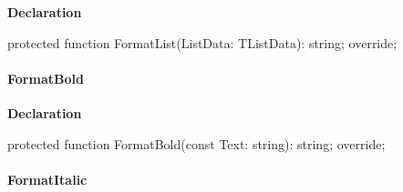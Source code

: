 \documentclass{report}
\newif\ifpdf
\begin{document}
\label{PasDoc_GenSimpleXML.TSimpleXMLDocGenerator-FormatList}
\begin{list}{}{
\setlength{\itemindent}{0cm}
\setlength{\listparindent}{0cm}
\setlength{\leftmargin}{\evensidemargin}
\addtolength{\leftmargin}{\tmplength}
\settowidth{\labelsep}{X}
\addtolength{\leftmargin}{\labelsep}
\setlength{\labelwidth}{\tmplength}
}
\item[\textbf{Declaration}\hfill]
\ifpdf
\begin{flushleft}
\fi
\begin{ttfamily}
protected function FormatList(ListData: TListData): string; override;\end{ttfamily}

\ifpdf
\end{flushleft}
\fi

\end{list}
\paragraph*{FormatBold}\hspace*{\fill}

\label{PasDoc_GenSimpleXML.TSimpleXMLDocGenerator-FormatBold}
\begin{list}{}{
\setlength{\itemindent}{0cm}
\setlength{\listparindent}{0cm}
\setlength{\leftmargin}{\evensidemargin}
\addtolength{\leftmargin}{\tmplength}
\settowidth{\labelsep}{X}
\addtolength{\leftmargin}{\labelsep}
\setlength{\labelwidth}{\tmplength}
}
\item[\textbf{Declaration}\hfill]
\ifpdf
\begin{flushleft}
\fi
\begin{ttfamily}
protected function FormatBold(const Text: string): string; override;\end{ttfamily}

\ifpdf
\end{flushleft}
\fi

\end{list}
\paragraph*{FormatItalic}\hspace*{\fill}
\end{document}
